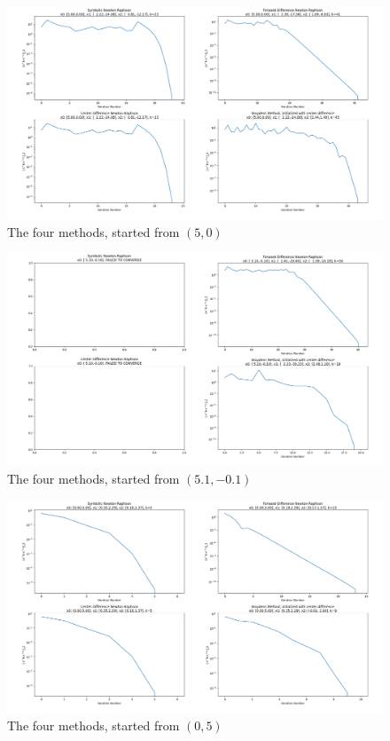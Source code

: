 \documentclass[11pt]{report}
\theoremstyle{definition}
\begin{document}
\begin{figure}
	\centering
	\includegraphics[width=1.25\textwidth, angle=90]{Figure_1.png}
	\caption{The four methods, started from $(5, 0)$}
\end{figure}
\begin{figure}
	\centering
	\includegraphics[width=1.25\textwidth, angle=90]{Figure_2.png}
	\caption{The four methods, started from $(5.1, -0.1)$}
\end{figure}
\begin{figure}
	\centering
	\includegraphics[width=1.25\textwidth, angle=90]{Figure_3.png}
	\caption{The four methods, started from $(0, 5)$}
\end{figure}
\end{document}
